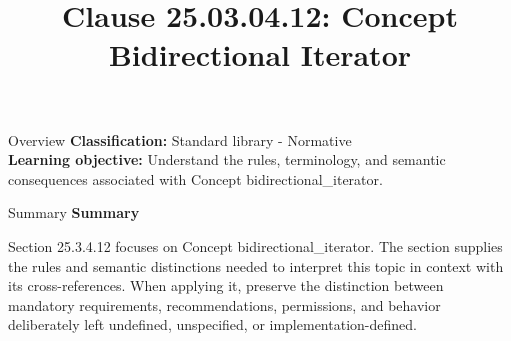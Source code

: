 \documentclass[10pt,letterpaper]{article}
\title{Clause 25.03.04.12: Concept Bidirectional Iterator}
\author{}
\date{}
\begin{document}
\maketitle
\begin{CornellOverviewBox}{Overview}
\textbf{Classification:} Standard library - Normative\\[2pt]
\textbf{Learning objective:} Understand the rules, terminology, and semantic consequences associated with Concept bidirectional\_iterator.
\end{CornellOverviewBox}\begin{CornellSummaryBox}{Summary}
{\sffamily\bfseries\color{Accent} Summary}\par\vspace{3pt}Section 25.3.4.12 focuses on Concept bidirectional\_iterator. The section supplies the rules and semantic distinctions needed to interpret this topic in context with its cross-references. When applying it, preserve the distinction between mandatory requirements, recommendations, permissions, and behavior deliberately left undefined, unspecified, or implementation-defined.
\end{CornellSummaryBox}
\end{document}
